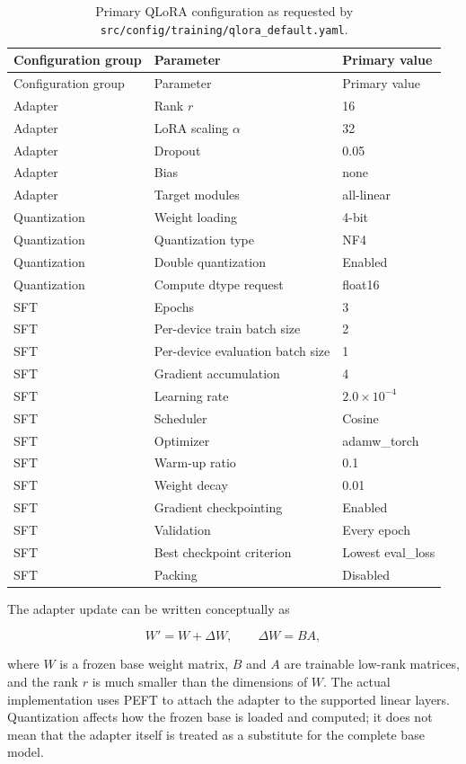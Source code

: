\begingroup\footnotesize\setlength{\tabcolsep}{3pt}\sloppy
\begin{longtable}[]{@{}lll@{}}
\caption{Primary QLoRA configuration as requested by \protect\nolinkurl{src/config/training/qlora_default.yaml}.}\tabularnewline
\toprule\noalign{}
Configuration group & Parameter & Primary value \\
\midrule\noalign{}
\endfirsthead
\toprule\noalign{}
Configuration group & Parameter & Primary value \\
\midrule\noalign{}
\endhead
\bottomrule\noalign{}
\endlastfoot
Adapter & Rank \(r\) & 16 \\
Adapter & LoRA scaling \(\alpha\) & 32 \\
Adapter & Dropout & 0.05 \\
Adapter & Bias & none \\
Adapter & Target modules & all-linear \\
Quantization & Weight loading & 4-bit \\
Quantization & Quantization type & NF4 \\
Quantization & Double quantization & Enabled \\
Quantization & Compute dtype request & float16 \\
SFT & Epochs & 3 \\
SFT & Per-device train batch size & 2 \\
SFT & Per-device evaluation batch size & 1 \\
SFT & Gradient accumulation & 4 \\
SFT & Learning rate & \(2.0\times10^{-4}\) \\
SFT & Scheduler & Cosine \\
SFT & Optimizer & adamw\_torch \\
SFT & Warm-up ratio & 0.1 \\
SFT & Weight decay & 0.01 \\
SFT & Gradient checkpointing & Enabled \\
SFT & Validation & Every epoch \\
SFT & Best checkpoint criterion & Lowest eval\_loss \\
SFT & Packing & Disabled \\
\end{longtable}
\endgroup

The adapter update can be written conceptually as

\[
W' = W + \Delta W,
\qquad
\Delta W = BA,
\]

where \(W\) is a frozen base weight matrix, \(B\) and \(A\) are trainable low-rank matrices, and the rank \(r\) is much smaller than the dimensions of \(W\). The actual implementation uses PEFT to attach the adapter to the supported linear layers. Quantization affects how the frozen base is loaded and computed; it does not mean that the adapter itself is treated as a substitute for the complete base model.

